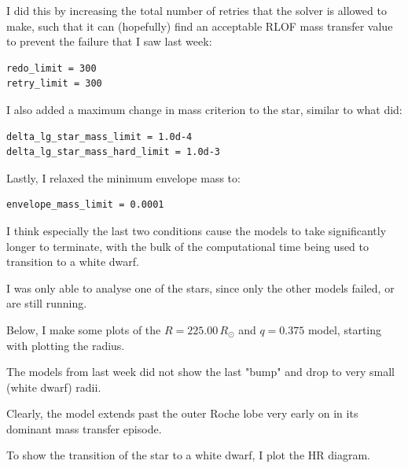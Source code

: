 \documentclass[a4paper,10pt]{article}
\begin{document}
I did this by increasing the total number of retries that the solver is allowed to make, such that it can (hopefully) find an acceptable RLOF mass transfer value to prevent the failure that I saw last week:

\begin{verbatim}
redo_limit = 300
retry_limit = 300
\end{verbatim}

I also added a maximum change in mass criterion to the star, similar to what \citet{temmink2022} did:

\begin{verbatim}
delta_lg_star_mass_limit = 1.0d-4
delta_lg_star_mass_hard_limit = 1.0d-3
\end{verbatim}

Lastly, I relaxed the minimum envelope mass to:
\begin{verbatim}
envelope_mass_limit = 0.0001
\end{verbatim}

I think especially the last two conditions cause the models to take significantly longer to terminate, with the bulk of the computational time being used to transition to a white dwarf.

I was only able to analyse one of the stars, since only the other models failed, or are still running.

Below, I make some plots of the \(R=225.00\,R_\odot \) and \(q=0.375\) model, starting with plotting the radius.
\begin{figure}[ht]
    \centering
\end{figure}

The models from last week did not show the last "bump" and drop to very small (white dwarf) radii.

\begin{figure}[ht]
    \centering
\end{figure}

Clearly, the model extends past the outer Roche lobe very early on in its dominant mass transfer episode.

\nextpage

To show the transition of the star to a white dwarf, I plot the HR diagram.
\begin{figure}[ht]
    \centering
\end{figure}
\end{document}
